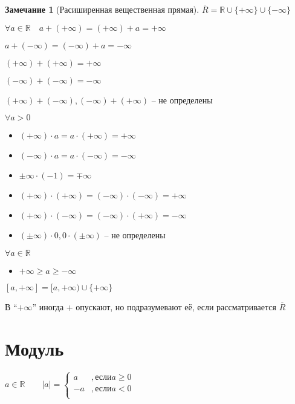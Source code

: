 \documentclass{book}
\newcommand\R{\ensuremath{\mathbb{R}}}
\newcommand{\ov}[1]{\overline{#1}}
\theoremstyle{definition}
\newtheorem*{note}{Замечание}
\begin{document}
        \begin{note}
            [Расиширенная вещественная прямая]

            $\overline{R} = \R\cup \{+\infty \}\cup \{-\infty \}$

            $\forall a\in \R\quad a + (+\infty ) = (+\infty ) + a = +\infty $

            $a+(-\infty ) = (-\infty ) + a = -\infty $

            $(+\infty ) + (+\infty ) = +\infty $

            $(-\infty ) + (-\infty ) = -\infty $

            $(+\infty ) + (-\infty ), (-\infty ) + (+\infty )$ -- не определены

            $\forall a>0$
            \begin{itemize}
                \item $(+\infty )\cdot a = a\cdot (+\infty ) = +\infty $
                \item $(-\infty ) \cdot  a = a\cdot (-\infty ) = -\infty $
                \item $\pm \infty \cdot (-1) = \mp \infty $
                \item $(+\infty ) \cdot  (+\infty ) = (-\infty )\cdot (-\infty ) = +\infty $
                \item $(+\infty )\cdot (-\infty ) = (-\infty )\cdot (+\infty ) = -\infty $
                \item $(\pm \infty )\cdot 0, 0\cdot (\pm \infty )$ -- не определены
            \end{itemize}

            $\forall a\in \R$
            \begin{itemize}
                \item $+\infty \geqslant a\geqslant -\infty $
            \end{itemize}

            $[a,+\infty ] = [a,+\infty ) \cup \{+\infty \}$

            В ``$+\infty $'' иногда + опускают, но подразумевают её, если рассматривается $\ov R$
        \end{note}

        \section{Модуль}

        $a\in \R\qquad |a| = \begin{cases}
            a&,\text{если} a\geqslant 0\\
            -a&, \text{если} a<0\\
        \end{cases}$
\end{document}
